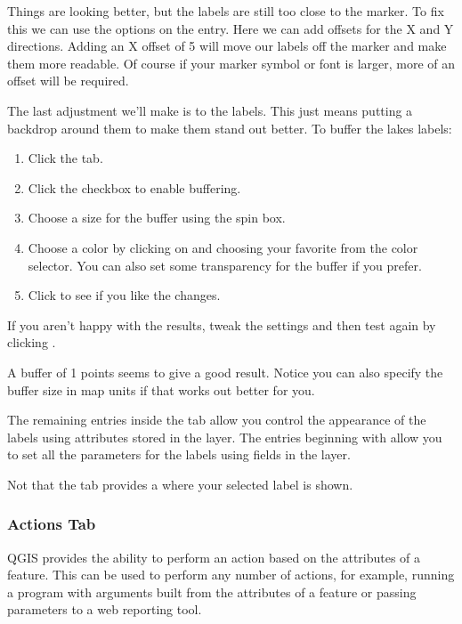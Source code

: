 Things are looking better, but the labels are still too close to the marker. To
fix this we can use the options on the  entry. Here we can add
offsets for the X and Y directions. Adding an X offset of 5 will move our
labels off the marker and make them more readable. Of course if your marker
symbol or font is larger, more of an offset will be required.

The last adjustment we'll make is to  the labels. This just means
putting a backdrop around them to make them stand out better. To buffer the
lakes labels:

\begin{enumerate}
\item Click the  tab.
\item Click the  checkbox to enable buffering.
\item Choose a size for the buffer using the spin box.
\item Choose a color by clicking on  and choosing your
  favorite from the color selector. You can also set some transparency for the
  buffer if you prefer.
\item Click  to see if you like the changes.
\end{enumerate} 

If you aren't happy with the results, tweak the settings and then test again
by clicking .

A buffer of 1 points seems to give a good result.
Notice you can also specify the buffer size in map units if that works out
better for you.

The remaining entries inside the  tab allow you control the appearance of the
labels using attributes stored in the layer. The entries beginning with  allow you to
set all the parameters for the labels using fields in the layer.

Not that the  tab provides a  where your
selected label is shown.

\subsubsection{Actions Tab}\label{label_actions}

QGIS provides the ability to perform an action based on the attributes of a
feature. This can be used to perform any number of actions, for example,
running a program with arguments built from the attributes of a feature or
passing parameters to a web reporting tool.


